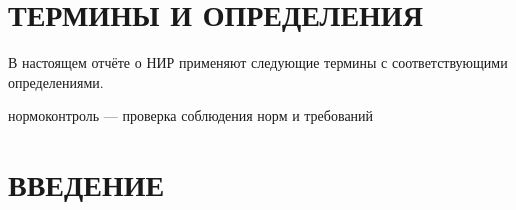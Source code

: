 \section*{ТЕРМИНЫ И ОПРЕДЕЛЕНИЯ}

В настоящем отчёте о НИР применяют следующие термины с соответствующими
определениями.

нормоконтроль — проверка соблюдения норм и требований

\section*{ВВЕДЕНИЕ}
